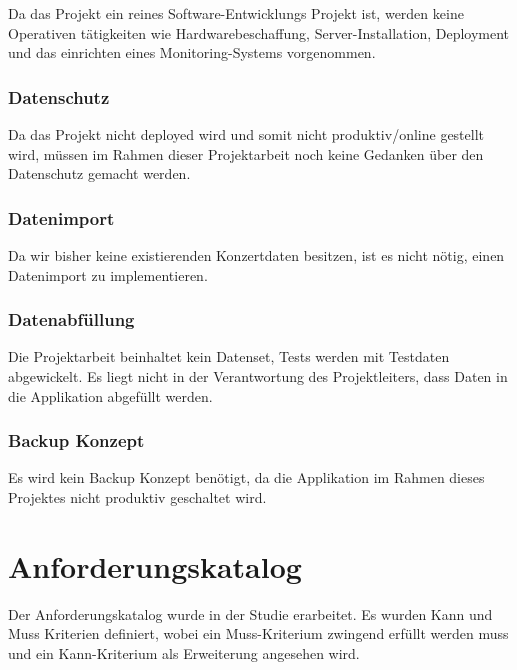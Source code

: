 Da das Projekt ein reines Software-Entwicklungs Projekt ist, werden
keine Operativen tätigkeiten wie Hardwarebeschaffung,
Server-Installation, Deployment und das einrichten eines
Monitoring-Systems vorgenommen.

\subsubsection{Datenschutz}\label{datenschutz}

Da das Projekt nicht deployed wird und somit nicht produktiv/online
gestellt wird, müssen im Rahmen dieser Projektarbeit noch keine Gedanken
über den Datenschutz gemacht werden.

\subsubsection{Datenimport}\label{datenimport}

Da wir bisher keine existierenden Konzertdaten besitzen, ist es nicht
nötig, einen Datenimport zu implementieren.

\subsubsection{Datenabfüllung}\label{datenabfuxfcllung}

Die Projektarbeit beinhaltet kein Datenset, Tests werden mit Testdaten
abgewickelt. Es liegt nicht in der Verantwortung des Projektleiters,
dass Daten in die Applikation abgefüllt werden.

\subsubsection{Backup Konzept}\label{backup-konzept}

Es wird kein Backup Konzept benötigt, da die Applikation im Rahmen
dieses Projektes nicht produktiv geschaltet wird.

\clearpage
\section{Anforderungskatalog}\label{anforderungskatalog}

Der Anforderungskatalog wurde in der Studie erarbeitet. Es wurden Kann und Muss
Kriterien definiert, wobei ein Muss-Kriterium zwingend erfüllt werden muss und
ein Kann-Kriterium als Erweiterung angesehen wird.




